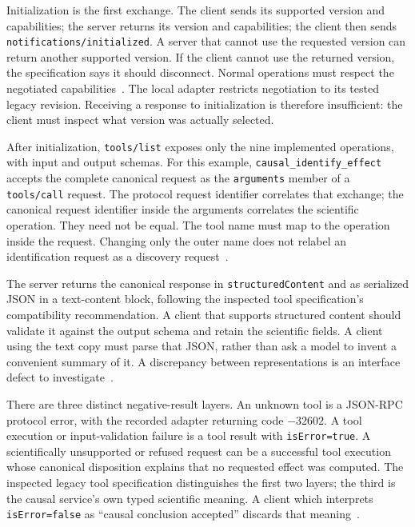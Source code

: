 Initialization is the first exchange. The client sends its supported version
and capabilities; the server returns its version and capabilities; the client
then sends \texttt{notifications/initialized}. A server that cannot use the
requested version can return another supported version. If the client cannot
use the returned version, the specification says it should disconnect.
Normal operations must respect the negotiated capabilities~\citep{v12_mcp_legacy_lifecycle}. The local adapter restricts negotiation to its
tested legacy revision. Receiving a response to initialization is therefore
insufficient: the client must inspect what version was actually selected.

After initialization, \texttt{tools/list} exposes only the nine implemented
operations, with input and output schemas. For this example,
\texttt{causal\_identify\_effect} accepts the complete canonical request as
the \texttt{arguments} member of a \texttt{tools/call} request. The protocol
request identifier correlates that exchange; the canonical request identifier
inside the arguments correlates the scientific operation. They need not be
equal. The tool name must map to the operation inside the request. Changing
only the outer name does not relabel an identification request as a discovery
request~\citep{v12_in_runtime}.

The server returns the canonical response in \texttt{structuredContent} and
as serialized JSON in a text-content block, following the inspected tool
specification's compatibility recommendation. A client that supports
structured content should validate it against the output schema and retain
the scientific fields. A client using the text copy must parse that JSON,
rather than ask a model to invent a convenient summary of it. A discrepancy
between representations is an interface defect to investigate~\citep{v12_mcp_legacy_tools,v12_in_runtime}.

There are three distinct negative-result layers. An unknown tool is a
JSON-RPC protocol error, with the recorded adapter returning code $-32602$.
A tool execution or input-validation failure is a tool result with
\texttt{isError=true}. A scientifically unsupported or refused request can
be a successful tool execution whose canonical disposition explains that
no requested effect was computed. The inspected legacy tool specification
distinguishes the first two layers; the third is the causal service's own
typed scientific meaning. A client which interprets
\texttt{isError=false} as ``causal conclusion accepted'' discards that meaning~\citep{v12_mcp_legacy_tools,exec13_i2_examples}.

